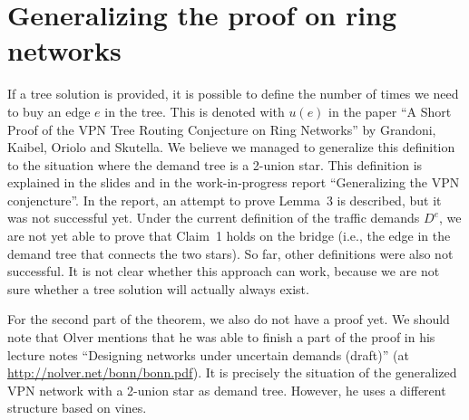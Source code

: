 \documentclass[11pt]{article}
\begin{document}
    \section{Generalizing the proof on ring networks}
    If a tree solution is provided, it is possible to define the number of times we need to buy an edge $e$ in the tree.
    This is denoted with $u(e)$ in the paper ``A Short Proof of the VPN Tree Routing Conjecture on Ring Networks'' by Grandoni, Kaibel, Oriolo and Skutella.
    We believe we managed to generalize this definition to the situation where the demand tree is a 2-union star.
    This definition is explained in the slides and in the work-in-progress report ``Generalizing the VPN conjencture''.
    In the report, an attempt to prove Lemma~3 is described, but it was not successful yet.
    Under the current definition of the traffic demands $D^e$, we are not yet able to prove that Claim~1 holds on the bridge (i.e., the edge in the demand tree that connects the two stars).
    So far, other definitions were also not successful.
    It is not clear whether this approach can work, because we are not sure whether a tree solution will actually always exist.

    For the second part of the theorem, we also do not have a proof yet.
    We should note that Olver mentions that he was able to finish a part of the proof in his lecture notes ``Designing networks under uncertain demands (draft)'' (at \url{http://nolver.net/bonn/bonn.pdf}).
    It is precisely the situation of the generalized VPN network with a 2-union star as demand tree.
    However, he uses a different structure based on vines.
\end{document}
